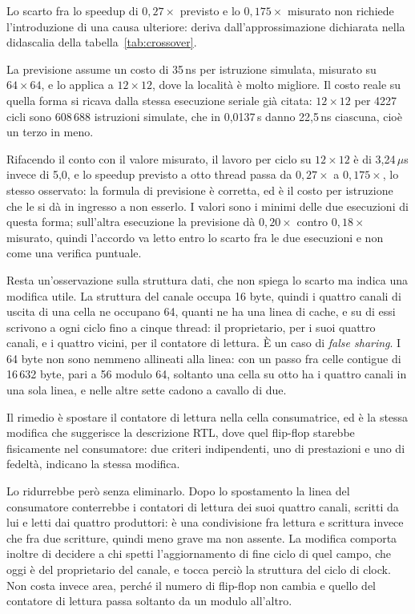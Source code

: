 Lo scarto fra lo speedup di $0{,}27\times$ previsto e lo $0{,}175\times$
misurato non richiede l'introduzione
di una causa ulteriore: deriva dall'approssimazione dichiarata nella didascalia della
tabella~\ref{tab:crossover}.


La previsione assume un costo di 35\,ns per istruzione simulata, misurato su $64\times64$, e lo applica a
$12\times12$, dove la località è molto migliore. Il costo reale su quella forma
si ricava dalla stessa esecuzione seriale già citata: $12\times12$ per 4227
cicli sono 608\,688 istruzioni simulate, che in 0,0137\,s danno 22,5\,ns
ciascuna, cioè un terzo in meno.

Rifacendo il conto con il valore misurato, il lavoro per ciclo su $12\times12$
è di 3,24\,$\mu$s invece di 5,0, e lo speedup previsto a otto thread passa da
$0{,}27\times$ a $0{,}175\times$, lo stesso osservato: la formula di previsione
è corretta, ed è il costo per istruzione che le si dà in ingresso a non esserlo.
I valori sono i minimi delle due esecuzioni di questa forma; sull'altra
esecuzione la previsione dà $0{,}20\times$ contro $0{,}18\times$ misurato, quindi
l'accordo va letto entro lo scarto fra le due esecuzioni e non come una
verifica puntuale.

Resta un'osservazione sulla struttura dati, che non spiega lo scarto ma indica
una modifica utile. La struttura del canale occupa 16 byte, quindi i quattro
canali di uscita di una cella ne occupano 64, quanti ne ha una linea di cache,
e su di essi scrivono a ogni ciclo fino a cinque thread: il proprietario, per i
suoi quattro canali, e i quattro vicini, per il contatore di lettura. È un caso
di \emph{false sharing}. I 64 byte non sono nemmeno allineati alla linea: con
un passo fra celle contigue di 16\,632 byte, pari a 56 modulo 64, soltanto una
cella su otto ha i quattro canali in una sola linea, e nelle altre sette cadono
a cavallo di due.

Il rimedio è spostare il contatore di lettura nella cella consumatrice, ed è la
stessa modifica che suggerisce la descrizione RTL, dove quel flip-flop
starebbe fisicamente nel consumatore: due criteri indipendenti, uno di
prestazioni e uno di fedeltà, indicano la stessa modifica.

Lo ridurrebbe però senza eliminarlo. Dopo lo spostamento la linea del
consumatore conterrebbe i contatori di lettura dei suoi quattro canali,
scritti da lui e letti dai quattro produttori: è una condivisione fra lettura e
scrittura invece che fra due scritture, quindi meno grave ma non assente. La
modifica comporta inoltre di decidere a chi spetti l'aggiornamento di fine
ciclo di quel campo, che oggi è del proprietario del canale, e tocca perciò la
struttura del ciclo di clock. Non costa invece area, perché il numero di
flip-flop non cambia e quello del contatore di lettura passa soltanto da un
modulo all'altro.

